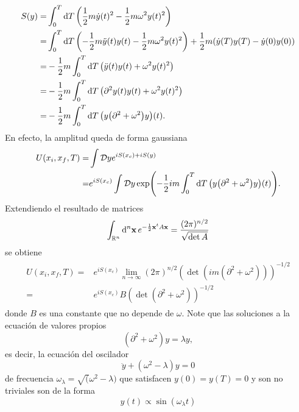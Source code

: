 \documentclass{article}
\begin{document}
\begin{align}\label{ec:accion_gaussiana}
\begin{split}
S(y)=&\int_0^T\dd{T}\qty(\frac{1}{2}m\dot{y}(t)^2-\frac{1}{2}m\omega^2y(t)^2)\\
=&\int_0^T\dd{T}\qty(-\frac{1}{2}m\ddot{y}(t)y(t)-\frac{1}{2}m\omega^2y(t)^2)+\frac{1}{2}m\qty(\dot{y}(T)y(T)-\dot{y}(0)y(0))\\
=&-\frac{1}{2}m\int_0^T\dd{T}\qty(\ddot{y}(t)y(t)+\omega^2y(t)^2)\\
=&-\frac{1}{2}m\int_0^T\dd{T}\qty(\partial^2y(t)y(t)+\omega^2y(t)^2)\\
=&-\frac{1}{2}m\int_0^T\dd{T}\qty(y\qty(\partial^2+\omega^2)y)(t).
\end{split}
\end{align}
En efecto, la amplitud queda de forma gaussiana
\begin{align}
\begin{split}
U(x_i,x_f,T)=&\int\mathcal{D}ye^{iS(x_c)+iS(y)}\\
=&e^{iS(x_c)}\int\mathcal{D}y\exp(-\frac{1}{2}im\int_0^T\dd{T}\qty(y\qty(\partial^2+\omega^2)y)(t)).
\end{split}
\end{align}
Extendiendo el resultado de matrices
\begin{equation}
\int_{\mathbb{R}^n}\dd[n]{\vb{x}}e^{-\frac{1}{2}\vb{x}^t A\vb{x}}=\frac{(2\pi)^{n/2}}{\sqrt{\det A}}
\end{equation}
se obtiene
\begin{align}
\begin{split}
U(x_i,x_f,T)=&e^{iS(x_c)}\lim_{n\rightarrow\infty}(2\pi)^{n/2}(\det(im(\partial^2+\omega^2)))^{-1/2}\\
=&e^{iS(x_c)}B(\det(\partial^2+\omega^2))^{-1/2}
\end{split}
\end{align}
donde $B$ es una constante que no depende de $\omega$. Note que las soluciones a la ecuación de valores propios
\begin{equation}
(\partial^2+\omega^2)y=\lambda y,
\end{equation}
es decir, la ecuación del oscilador
\begin{equation}
\ddot{y}+(\omega^2-\lambda)y=0
\end{equation}
de frecuencia $\omega_\lambda=\sqrt(\omega^2-\lambda)$ que satisfacen $y(0)=y(T)=0$ y son no triviales son de la forma
\begin{equation}
y(t)\propto\sin(\omega_\lambda t)
\end{equation}
\end{document}
